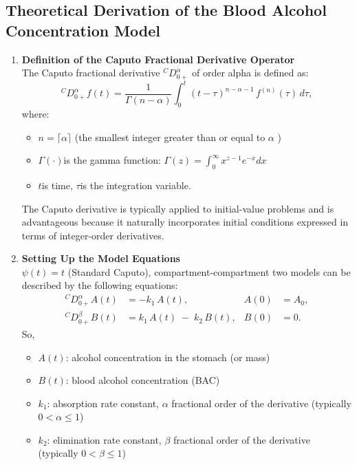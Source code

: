 \documentclass[11pt]{article}
\begin{document}
\subsection{Theoretical Derivation of the Blood Alcohol Concentration Model}

\label{subsec:derivation}

\begin{enumerate}
  \item \textbf{Definition of the Caputo Fractional Derivative Operator}\\
    The Caputo fractional derivative \({}^{C\!}D_{0+}^\alpha\) of order alpha is defined as: 
    \[
      {}^{C\!}D_{0+}^\alpha f(t)
      = \frac{1}{\Gamma(n-\alpha)}
        \int_{0}^{t}
          (t-\tau)^{n-\alpha-1}\,
          f^{(n)}(\tau)\,
        d\tau,
    \]
    where:
    \begin{itemize}
      \item \(n = \lceil \alpha \rceil\) (the smallest integer greater than or equal to $\alpha$ )  
      \item \(\Gamma(\cdot)\)is the gamma function: \(\Gamma(z)=\int_{0}^{\infty}x^{z-1}e^{-x}dx\)  
      \item \(t\)is time, \(\tau\)is the integration variable.  
    \end{itemize}
    The Caputo derivative is typically applied to initial-value problems and is advantageous because it naturally incorporates initial conditions expressed in terms of integer-order derivatives.


  \item \textbf{Setting Up the Model Equations}\\
    \(\psi(t)=t\) (Standard Caputo), compartment-compartment two models  can be described by the following equations:
    \begin{align}
      {}^{C\!}D_{0+}^\alpha A(t)
      &= -k_1\,A(t),
      &A(0) &= A_0,
      \label{eq:fde_A} \\
      {}^{C\!}D_{0+}^\beta B(t)
      &= k_1\,A(t) \;-\; k_2\,B(t),
      &B(0) &= 0.
      \label{eq:fde_B}
    \end{align}
    So,
    \begin{itemize}
      \item \(A(t)\): alcohol concentration in the stomach (or mass)
      \item \(B(t)\): blood alcohol concentration (BAC)\  
      \item \(k_1\): absorption rate constant, \(\alpha\) fractional order of the derivative (typically \(0<\alpha\le1\))\  
      \item \(k_2\): elimination rate constant, \(\beta\) fractional order of the derivative (typically \(0<\beta\le1\))\  
    \end{itemize}


\end{enumerate}
\end{document}
